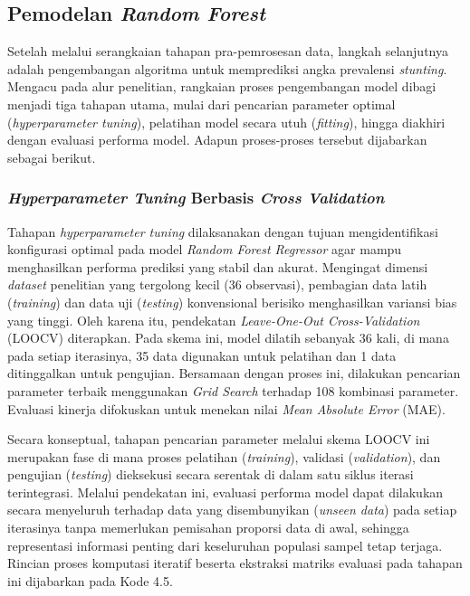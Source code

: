 \subsection{Pemodelan \textit{Random Forest}}
Setelah melalui serangkaian tahapan pra-pemrosesan data, langkah selanjutnya adalah pengembangan algoritma untuk memprediksi angka prevalensi \textit{stunting}. Mengacu pada alur penelitian, rangkaian proses pengembangan model dibagi menjadi tiga tahapan utama, mulai dari pencarian parameter optimal (\textit{hyperparameter tuning}), pelatihan model secara utuh (\textit{fitting}), hingga diakhiri dengan evaluasi performa model. Adapun proses-proses tersebut dijabarkan sebagai berikut.

\subsubsection{\textit{Hyperparameter Tuning} Berbasis \textit{Cross Validation}}
Tahapan \textit{hyperparameter tuning} dilaksanakan dengan tujuan mengidentifikasi konfigurasi optimal pada model \textit{Random Forest Regressor} agar mampu menghasilkan performa prediksi yang stabil dan akurat. Mengingat dimensi \textit{dataset} penelitian yang tergolong kecil (36 observasi), pembagian data latih (\textit{training}) dan data uji (\textit{testing}) konvensional berisiko menghasilkan variansi bias yang tinggi. Oleh karena itu, pendekatan \textit{Leave-One-Out Cross-Validation} (LOOCV) diterapkan. Pada skema ini, model dilatih sebanyak 36 kali, di mana pada setiap iterasinya, 35 data digunakan untuk pelatihan dan 1 data ditinggalkan untuk pengujian. Bersamaan dengan proses ini, dilakukan pencarian parameter terbaik menggunakan \textit{Grid Search} terhadap 108 kombinasi parameter. Evaluasi kinerja difokuskan untuk menekan nilai \textit{Mean Absolute Error} (MAE).

Secara konseptual, tahapan pencarian parameter melalui skema LOOCV ini merupakan fase di mana proses pelatihan (\textit{training}), validasi (\textit{validation}), dan pengujian (\textit{testing}) dieksekusi secara serentak di dalam satu siklus iterasi terintegrasi. Melalui pendekatan ini, evaluasi performa model dapat dilakukan secara menyeluruh terhadap data yang disembunyikan (\textit{unseen data}) pada setiap iterasinya tanpa memerlukan pemisahan proporsi data di awal, sehingga representasi informasi penting dari keseluruhan populasi sampel tetap terjaga. Rincian proses komputasi iteratif beserta ekstraksi matriks evaluasi pada tahapan ini dijabarkan pada Kode 4.5.

